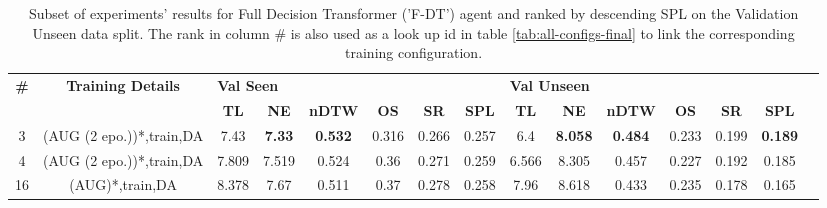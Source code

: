 \begin{table}
\centering
\caption{\label{tab:f_dt_dagger_envdrop}Subset of experiments' results for Full Decision Transformer ('F-DT') agent and ranked by descending SPL on the Validation Unseen data split. The rank in column \# is also used as a look up id in table \ref{tab:all-configs-final} to link the corresponding training configuration.}
\begin{tabular}{@{\hskip3pt}c@{\hskip3pt}c@{\hskip3pt}c@{\hskip3pt}c@{\hskip3pt}c@{\hskip3pt}c@{\hskip3pt}c@{\hskip3pt}c@{\hskip3pt}c@{\hskip3pt}c@{\hskip3pt}c@{\hskip3pt}c@{\hskip3pt}c@{\hskip3pt}c@{\hskip3pt}c}
\toprule
\textbf{\#} & \textbf{Training Details} & \multicolumn{6}{l}{\textbf{Val Seen}} & \multicolumn{6}{l}{\textbf{Val Unseen}} \\
 \textbf{~} &                \textbf{~} &       \textbf{TL} &    \textbf{NE} &   \textbf{nDTW} & \textbf{OS} & \textbf{SR} & \textbf{SPL} &         \textbf{TL} &     \textbf{NE} &   \textbf{nDTW} & \textbf{OS} & \textbf{SR} &    \textbf{SPL} \\
\midrule
          3 &  (AUG (2 epo.))*,train,DA &              7.43 &  \textbf{7.33} &  \textbf{0.532} &       0.316 &       0.266 &        0.257 &                 6.4 &  \textbf{8.058} &  \textbf{0.484} &       0.233 &       0.199 &  \textbf{0.189} \\
          4 &  (AUG (2 epo.))*,train,DA &             7.809 &          7.519 &           0.524 &        0.36 &       0.271 &        0.259 &               6.566 &           8.305 &           0.457 &       0.227 &       0.192 &           0.185 \\
         16 &           (AUG)*,train,DA &             8.378 &           7.67 &           0.511 &        0.37 &       0.278 &        0.258 &                7.96 &           8.618 &           0.433 &       0.235 &       0.178 &           0.165 \\
\bottomrule
\end{tabular}
\end{table}
